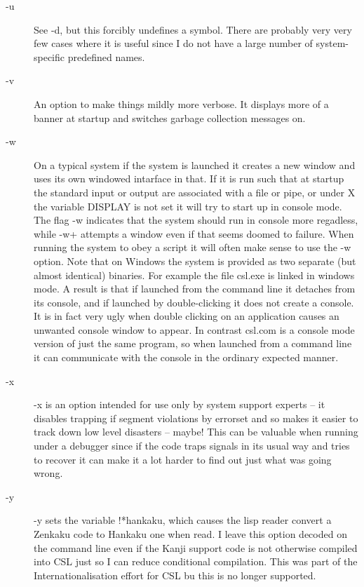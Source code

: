 \documentclass[a4paper,11pt]{article}
\begin{document}
\begin{description}
\item [{\ttfamily -u}]
See {\ttfamily -d}, but this forcibly undefines a symbol. There are probably
very very few cases where it is useful since I do not have a large
number of system-specific predefined names.

\item [{\ttfamily -v}]
An option to make things mildly more verbose. It displays more of a banner
at startup and switches garbage collection messages on.

\item [{\ttfamily -w}]
On a typical system if the system is launched it creates a new window and uses
its own windowed intarface in that. If it is run such that at startup the
standard input or output are associated with a file or pipe, or under X the
variable {\ttfamily DISPLAY} is not set it will try to start up in console
mode. The flag {\ttfamily -w} indicates that the system should run in console
more regadless, while {\ttfamily -w+} attempts a window even if that seems
doomed to failure. When running the system to obey a script it will often make
sense to use the {\ttfamily -w} option. Note that on Windows the system is
provided as two separate (but almost identical) binaries. For example the
file {\ttfamily csl.exe} is linked in windows mode. A result is that if
launched from the command line it detaches from its console, and if launched
by double-clicking it does not create a console. It is in fact very ugly when
double clicking on an application causes an unwanted console window to appear.
In contrast {\ttfamily csl.com} is a console mode version of just the same
program, so when launched from a command line it can communicate with the
console in the ordinary expected manner.

\item [{\ttfamily -x}]
{\ttfamily -x} is an option intended for use only by system
support experts -- it disables trapping if segment violations by
errorset and so makes it easier to track down low level disasters --
maybe!  This can be valuable when running under a debugger since if the
code traps signals in its usual way and tries to recover it can make it a lot
harder to find out just what was going wrong.

\item [{\ttfamily -y}]
{\ttfamily -y } sets the variable {\ttfamily !*hankaku}, which causes the
lisp reader convert a Zenkaku code to Hankaku one when read. I leave this
option decoded on the command line even if the Kanji support code is not
otherwise compiled into CSL just so I can reduce conditional compilation.
This was part of the Internationalisation effort for CSL bu this is no longer
supported.


\end{description}
\end{document}
